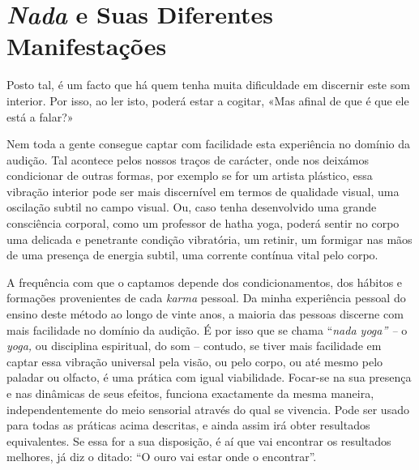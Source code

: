 \chapter{\emph{Nada} e Suas Diferentes Manifestações}

Posto tal, é um facto que há quem tenha muita dificuldade em discernir
este som interior. Por isso, ao ler isto, poderá estar a cogitar, «Mas
afinal de que é que ele está a falar?»

Nem toda a gente consegue captar com facilidade esta experiência no
domínio da audição. Tal acontece pelos nossos traços de carácter, onde
nos deixámos condicionar de outras formas, por exemplo se for um artista
plástico, essa vibração interior pode ser mais discernível em termos de
qualidade visual, uma oscilação subtil no campo visual. Ou, caso tenha
desenvolvido uma grande consciência corporal, como um professor de hatha
yoga, poderá sentir no corpo uma delicada e penetrante condição
vibratória, um retinir, um formigar nas mãos de uma presença de energia
subtil, uma corrente contínua vital pelo corpo.

A frequência com que o captamos depende dos condicionamentos, dos
hábitos e formações provenientes de cada \emph{karma} pessoal. Da minha
experiência pessoal do ensino deste método ao longo de vinte anos, a
maioria das pessoas discerne com mais facilidade no domínio da audição.
É por isso que se chama ``\emph{nada yoga'' --} o \emph{yoga,} ou
disciplina espiritual, do som -- contudo, se tiver mais facilidade em
captar essa vibração universal pela visão, ou pelo corpo, ou até mesmo
pelo paladar ou olfacto, é uma prática com igual viabilidade. Focar-se
na sua presença e nas dinâmicas de seus efeitos, funciona exactamente da
mesma maneira, independentemente do meio sensorial através do qual se
vivencia. Pode ser usado para todas as práticas acima descritas, e ainda
assim irá obter resultados equivalentes. Se essa for a sua disposição, é
aí que vai encontrar os resultados melhores, já diz o ditado: ``O ouro
vai estar onde o encontrar''.

